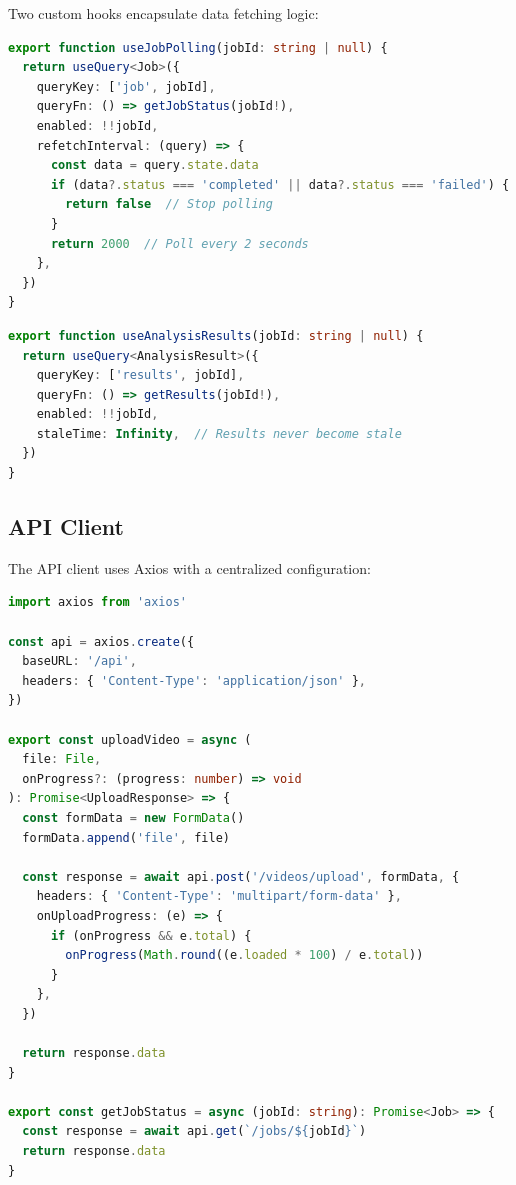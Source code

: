 Two custom hooks encapsulate data fetching logic:

\begin{lstlisting}[language=TypeScript, caption={Job polling hook (hooks/useJobPolling.ts)}]
export function useJobPolling(jobId: string | null) {
  return useQuery<Job>({
    queryKey: ['job', jobId],
    queryFn: () => getJobStatus(jobId!),
    enabled: !!jobId,
    refetchInterval: (query) => {
      const data = query.state.data
      if (data?.status === 'completed' || data?.status === 'failed') {
        return false  // Stop polling
      }
      return 2000  // Poll every 2 seconds
    },
  })
}
\end{lstlisting}

\begin{lstlisting}[language=TypeScript, caption={Analysis results hook (hooks/useAnalysisResults.ts)}]
export function useAnalysisResults(jobId: string | null) {
  return useQuery<AnalysisResult>({
    queryKey: ['results', jobId],
    queryFn: () => getResults(jobId!),
    enabled: !!jobId,
    staleTime: Infinity,  // Results never become stale
  })
}
\end{lstlisting}

\subsection{API Client}

The API client uses Axios with a centralized configuration:

\begin{lstlisting}[language=TypeScript, caption={API client configuration (services/api.ts)}]
import axios from 'axios'

const api = axios.create({
  baseURL: '/api',
  headers: { 'Content-Type': 'application/json' },
})

export const uploadVideo = async (
  file: File,
  onProgress?: (progress: number) => void
): Promise<UploadResponse> => {
  const formData = new FormData()
  formData.append('file', file)

  const response = await api.post('/videos/upload', formData, {
    headers: { 'Content-Type': 'multipart/form-data' },
    onUploadProgress: (e) => {
      if (onProgress && e.total) {
        onProgress(Math.round((e.loaded * 100) / e.total))
      }
    },
  })

  return response.data
}

export const getJobStatus = async (jobId: string): Promise<Job> => {
  const response = await api.get(`/jobs/${jobId}`)
  return response.data
}
\end{lstlisting}


